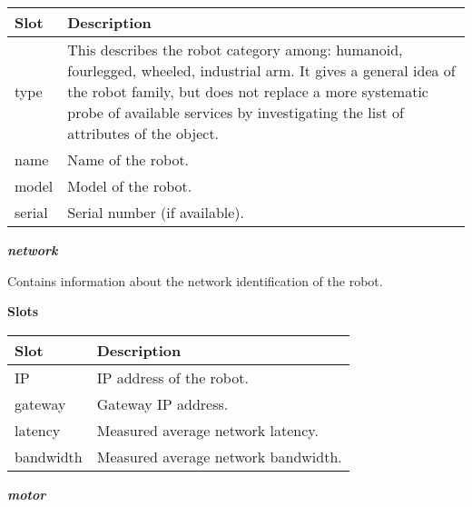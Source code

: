 \documentclass[a4paper]{article}
\begin{document}
\begin{flushleft}
\tablehead{}
\begin{supertabular}{|m{2.8669999cm}|m{12.472cm}|}
\hline
{}\sffamily\bfseries Slot &
\sffamily\bfseries Description\\\hline
{} type &
\sffamily This describes the robot category
among: humanoid, fourlegged, wheeled, industrial arm. It gives a
general idea of the robot family, but does not replace a more
systematic probe of available services by investigating the list of
attributes of the object.\\\hline
{} name &
\sffamily Name of the robot.\\\hline
{} model &
\sffamily Model of the robot.\\\hline
{} serial &
\sffamily Serial number (if available).\\\hline
\end{supertabular}
\end{flushleft}
{\sffamily\bfseries\itshape
network}

{\sffamily
Contains information about the network identification of the robot.}

{\sffamily\bfseries
Slots}

\begin{flushleft}
\tablehead{}
\begin{supertabular}{|m{2.8669999cm}|m{12.422cm}|}
\hline
{}\sffamily\bfseries Slot &
\sffamily\bfseries Description\\\hline
{} IP &
\sffamily IP address of the robot.\\\hline
{} gateway &
\sffamily Gateway IP address.\\\hline
{} latency &
\sffamily Measured average network
latency.\\\hline
{} bandwidth &
\sffamily Measured average network
bandwidth.\\\hline
\end{supertabular}
\end{flushleft}
{\sffamily\bfseries\itshape
motor}
\end{document}
